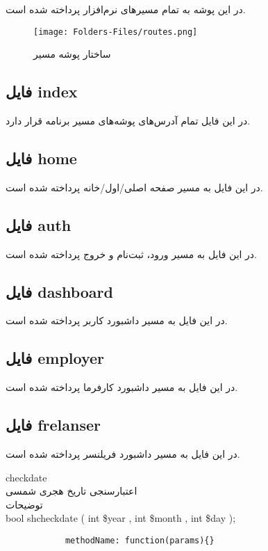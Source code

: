 در این پوشه به تمام مسیر‌های نرم‌افزار پرداخته شده است.

\begin{figure}[H]
	\texttt{[image: Folders-Files/routes.png]}
	\centering
	\caption{ساختار پوشه مسیر}
	\label{fig:folder-routes}
\end{figure}

\subsection{فایل index}
در این فایل تمام آدرس‌های پوشه‌های مسیر برنامه قرار دارد.

\subsection{فایل home}
در این فایل به مسیر صفحه اصلی/اول/خانه پرداخته شده است.

\subsection{فایل auth}
در این فایل به مسیر ورود، ثبت‌نام و خروج پرداخته شده است.

\subsection{فایل dashboard}
در این فایل به مسیر داشبورد کاربر پرداخته شده است.

\subsection{فایل employer}
در این فایل به مسیر داشبورد کارفرما پرداخته شده است.

\subsection{فایل frelanser}
در این فایل به مسیر داشبورد فریلنسر پرداخته شده است.



checkdate
\\
 اعتبارسنجی تاریخ هجری شمسی
\\
توضیحات
\\
bool shcheckdate ( int \$year , int \$month , int \$day );

\begin{lstlisting}
			methodName: function(params){}
\end{lstlisting}



